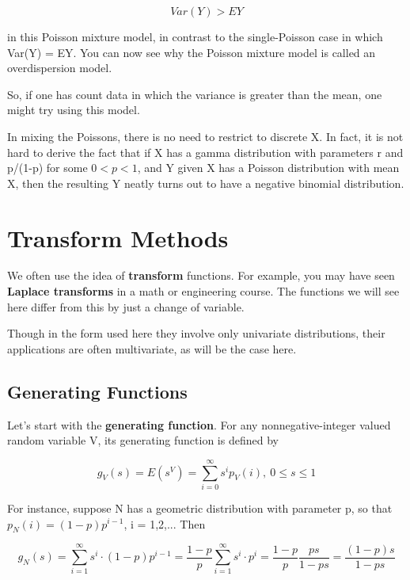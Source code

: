 \begin{equation}
Var(Y) > EY
\end{equation}

in this Poisson mixture model, in contrast to the single-Poisson case
in which Var(Y) = EY.  You can now see why the Poisson mixture model is
called an overdispersion model.

So, if one has count data in which the variance is greater than the
mean, one might try using this model.

In mixing the Poissons, there is no need to restrict to discrete X.  In
fact, it is not hard to derive the fact that if X has a gamma
distribution with parameters r and p/(1-p) for some $0 < p < 1$, and Y
given X has a Poisson distribution with mean X, then the resulting Y
neatly turns out to have a negative binomial distribution.

\section{Transform Methods}

We often use the idea of \textbf{transform} functions.  For example, you
may have seen \textbf{Laplace transforms} in a math or engineering
course.  The functions we will see here differ from this by just
a change of variable. 

Though in the form used here they involve only univariate distributions,
their applications are often multivariate, as will be the case here.

\subsection{Generating Functions}

Let's start with the \textbf{generating function}.
For any nonnegative-integer valued
random variable V, its generating function is defined by

\begin{equation}
\label{genftn}
g_V(s)=E(s^{V}) = \sum_{i=0}^\infty s^i p_V(i), ~ 0 \leq s \leq 1
\end{equation}

For instance, suppose N has a geometric distribution with parameter p,
so that $p_N(i) = (1-p) p^{i-1}$, i = 1,2,...  Then

\begin{equation}
g_N(s) = \sum_{i=1}^\infty s^i \cdot (1-p) p^{i-1} 
= \frac{1-p}{p} \sum_{i=1}^\infty s^i \cdot p^i 
= \frac{1-p}{p} \frac{ps}{1-ps}
= \frac{(1-p)s}{1-ps}
\end{equation}

